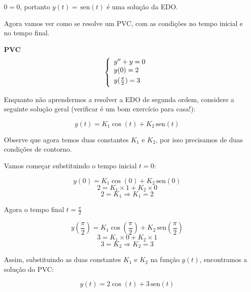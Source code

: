 \documentclass[a4paper]{article}
\providecommand{\sin}{} \renewcommand{\sin}{\hspace{2pt}\mathrm{sen}}
\begin{document}
$0=0$, portanto $y(t) = \sin(t)$ é uma solução da EDO.


Agora vamos ver como se resolve um PVC, com as condições no tempo
inicial e no tempo final.

{\bf PVC}
\begin{displaymath}
  \left\{
    \begin{array}{l}
      y'' + y=0\\
      \smallskip
      y(0)=2\\
      \smallskip
      y(\frac{\pi}{2})=3
    \end{array}
  \right.
\end{displaymath}

Enquanto não aprendermos a resolver a EDO de segunda ordem, considere
a seguinte solução geral (verificar é um bom exercício para casa!):

\begin{displaymath}
  y(t) = K_1\cos(t) + K_2\sin(t)
\end{displaymath}

Observe que agora temos duas constantes $K_1$ e $K_2$, por isso
precisamos de duas condições de contorno.

Vamos começar substituindo o tempo inicial $t=0$:

\begin{displaymath}
  y(0)= K_1\cos(0) + K_2\sin(0)
\end{displaymath}
\begin{displaymath}
  2 = K_1 \times 1 + K_2 \times 0
\end{displaymath}
\begin{displaymath}
  2=K_1 \Rightarrow K_1 = 2
\end{displaymath}

Agora o tempo final $t=\frac{\pi}{2}$

\begin{displaymath}
  y(\frac{\pi}{2}) = K_1 \cos(\frac{\pi}{2}) + K_2\sin(\frac{\pi}{2})
\end{displaymath}
\begin{displaymath}
  3 = K_1 \times 0 + K_2\times 1
\end{displaymath}
\begin{displaymath}
  3 = K_2 \Rightarrow K_2 = 3
\end{displaymath}

Assim, substituindo as duas constantes $K_1$ e $K_2$ na função $y(t)$,
encontramos a solução do PVC:

\begin{displaymath}
  y(t) = 2\cos(t) + 3\sin(t)
\end{displaymath}
\end{document}
